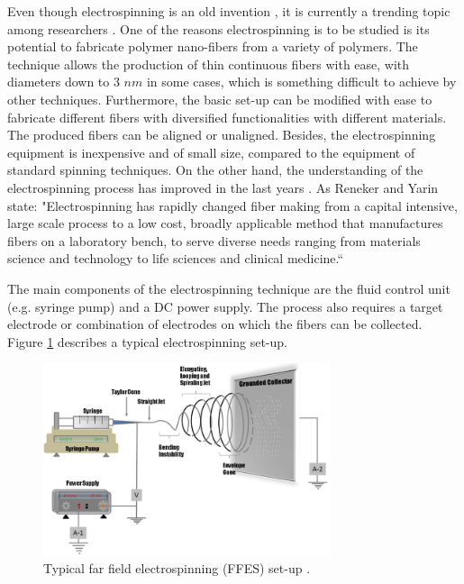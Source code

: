 Even though electrospinning is an old invention \cite{Anton1930}, it is currently a trending topic among researchers \cite{Huang2003,Reneker2008,Schiffman2008}. One of the reasons electrospinning is to be studied is its potential to fabricate polymer nano-fibers from a variety of polymers. The technique allows the production of thin continuous fibers with ease, with diameters down to 3 $n m$ in some cases, which is something difficult to achieve by other techniques. Furthermore, the basic set-up can be modified with ease to fabricate different fibers with diversified functionalities with different materials. The produced fibers can be aligned or unaligned. Besides, the electrospinning equipment is inexpensive and of small size, compared to the equipment of standard spinning techniques. On the other hand, the understanding of the electrospinning process has improved in the last years \cite{Li2012}. As Reneker and Yarin state: "Electrospinning has rapidly changed fiber making from a capital intensive, large scale process to a low cost, broadly applicable method that manufactures fibers on a laboratory bench, to serve diverse needs ranging from materials science and technology to life sciences and clinical medicine.`` \cite{Reneker2008}

The main components of the electrospinning technique are the fluid control unit (e.g. syringe pump) and a DC power supply. The process also requires a target electrode or combination of electrodes on which the fibers can be collected. Figure \ref{fig:FFES} describes a typical electrospinning set-up. \cite{Li2012}

\begin{figure}[th]
\centering
\includegraphics[width=0.75\textwidth]{./Figures/FFES.png}
\decoRule
\caption[Far Field Electrospinning set-up]{Typical far field electrospinning (FFES) set-up \cite{Li2012}.}
\label{fig:FFES}
\end{figure}

